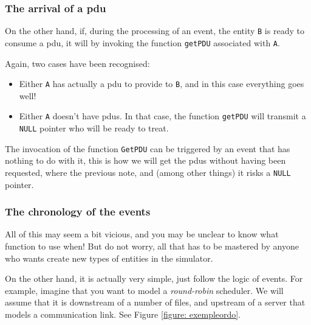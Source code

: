 %
\subsubsection{The arrival of a {\sc pdu}}

   On the other hand, if, during the processing of an event, the entity
{\tt B} is ready to consume a {\sc pdu}, it will by invoking
the function \lstinline!getPDU! associated with {\tt A}.

    Again, two cases have been recognised:

\begin{itemize}
   \item Either {\tt A} has actually a {\sc pdu} to provide
      to {\tt B}, and in this case everything goes well!
   \item Either {\tt A} doesn't have {\sc pdu}s. In that case, the function
     \lstinline!getPDU! will transmit a \lstinline!NULL! pointer who
     will be ready to treat.
\end{itemize}

   The invocation of the function \lstinline!GetPDU! can be triggered by an event that has nothing to do with it, this is how we will get the {\sc pdu}s without
having been requested, where the previous note, and (among other things) it 
risks a \lstinline!NULL! pointer.

%
\subsubsection{The chronology of the events}

   All of this may seem a bit vicious, and you may be unclear to know what 
function to use when! But do not worry, all that has to be mastered by anyone 
who wants create new types of entities in the simulator.

    On the other hand, it is actually very simple, just follow the
logic of events. For example, imagine that you want to
model a {\em round-robin} scheduler. We will assume that it is
downstream of a number of files, and upstream of a server that
models a communication link. See Figure
\ref {figure: exempleordo}.    


